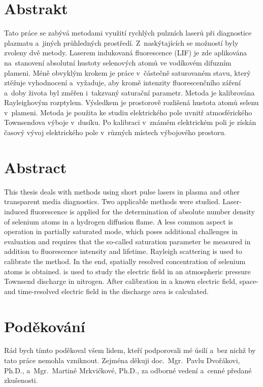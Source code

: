 \chapter*{Abstrakt}
Tato práce se zabývá metodami využití rychlých pulzních laserů
při diagnostice plazmatu a~jiných průhledných prostředí.
Z~naskýtajících se možností byly zvoleny dvě metody.
Laserem indukovaná fluorescence (LIF)
je zde aplikována na~stanovení absolutní
hustoty selenových atomů ve vodíkovém difuzním plameni.
Méně obvyklým krokem je práce v~částečně saturovaném stavu,
který ztěžuje vyhodnocení a~vyžaduje, aby kromě intenzity fluorescenčního
záření a~doby života byl změřen i~takzvaný saturační parametr.
Metoda je kalibrována Rayleighovým rozptylem.
Výsledkem je prostorově rozlišená hustota atomů selenu v~plameni.
Metoda \EFISH{} je použita ke studiu elektrického pole uvnitř atmosférického
Townsendova výboje v~dusíku.
Po kalibraci v~známém elektrickém poli je získán časový vývoj
elektrického pole v~různých místech výbojového prostoru.
\vfill
{\let\clearpage\relax\chapter*{Abstract}}
\thispagestyle{empty}
This thesis deals with methods using short pulse lasers
in plasma and other transparent media diagnostics.
Two applicable methods were studied.
Laser-induced fluorescence is applied for the determination
of absolute number density of selenium atoms in a hydrogen
diffusion flame.
A less common aspect is operation in partially saturated mode,
which poses additional challenges in evaluation
and requires that the so-called saturation parameter be measured
in addition to fluorescence intensity and lifetime.
Rayleigh scattering is used to calibrate the method.
In the end, spatially resolved concentration of selenium atoms is obtained.
\EFISH{} is used to study the electric field in an atmospheric pressure
Townsend discharge in nitrogen.
After calibration in a known electric field, space- and time-resolved
electric field in the discharge area is calculated.

\cleardoublepage


\chapter*{Poděkování}
Rád bych tímto poděkoval všem lidem, kteří podporovali mé úsilí
a~bez nichž by tato práce nemohla vzniknout.
Zejména děkuji doc.~Mgr.~Pavlu Dvořákovi, Ph.D.,
a~Mgr.~Martině Mrkvičkové, Ph.D.,
za odborné vedení a~cenné předané zkušenosti.

